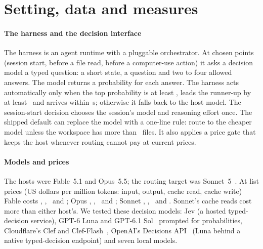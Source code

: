 \section{Setting, data and measures}\label{sec:setting}

\paragraph{The harness and the decision interface} The harness is an agent runtime with a pluggable orchestrator.
At chosen points (session start, before a file read, before a computer-use action) it asks a decision model a typed
question: a short state, a question and two to four allowed answers. The model returns a probability for each answer. The
harness acts automatically only when the top probability is at least \MinP, leads the runner-up by at least
\MinMargin\ and arrives within \TimeoutS\,s; otherwise it falls back to the host model. The session-start decision
chooses the session's model and reasoning effort once. The shipped default can replace the model with a one-line rule:
route to the cheaper model unless the workspace has more than \AoScopeFiles\ files. It also applies a price gate that
keeps the host whenever routing cannot pay at current prices.

\paragraph{Models and prices} The hosts were Fable~5.1 and Opus~5.5; the routing target was Sonnet~5~\cite{anthropicmodels}. At list prices
(US dollars per million tokens: input, output, cache read, cache write) Fable costs \PriceFableIn, \PriceFableOut,
\PriceFableRead\ and \PriceFableWrite; Opus \PriceOpusIn, \PriceOpusOut, \PriceOpusRead\ and \PriceOpusWrite; Sonnet
\PriceSonnetIn, \PriceSonnetOut, \PriceSonnetRead\ and \PriceSonnetWrite. Sonnet's cache reads cost more than either
host's. We tested these decision models: Jev (a hosted typed-decision service), GPT-6 Luna and GPT-6.1 Sol~\cite{oapricing} prompted for
probabilities, Cloudflare's Clef and Clef-Flash~\cite{clefcard,clefdocs}, OpenAI's Decisions API~\cite{oadecisions} (Luna behind a native typed-decision endpoint)
and seven local models.

